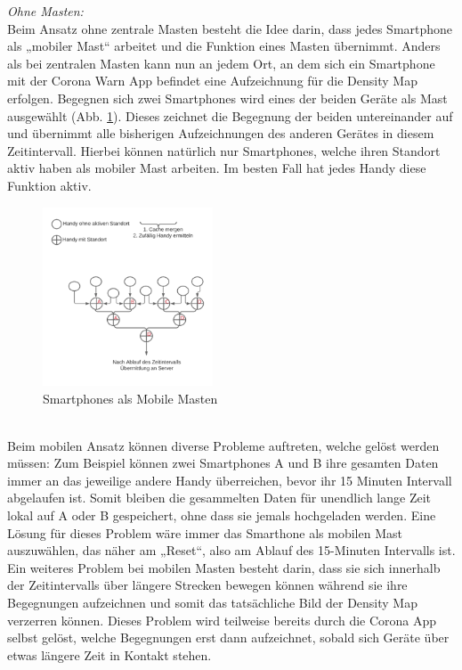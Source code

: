\documentclass[conference]{IEEEtran}
\begin{document}
\textit{Ohne Masten:}\\
Beim Ansatz ohne zentrale Masten besteht die Idee darin, dass jedes Smartphone als „mobiler Mast“ arbeitet und die Funktion eines Masten übernimmt. 
Anders als bei zentralen Masten kann nun an jedem Ort, an dem sich ein Smartphone mit der Corona Warn App befindet eine Aufzeichnung für die Density Map erfolgen. 
Begegnen sich zwei Smartphones wird eines der beiden Geräte als Mast ausgewählt (Abb. \ref{mobile_mast}). 
Dieses zeichnet die Begegnung der beiden untereinander auf und übernimmt alle bisherigen Aufzeichnungen des anderen Gerätes in diesem Zeitintervall. Hierbei können natürlich nur Smartphones, welche ihren Standort aktiv haben als mobiler Mast arbeiten. 
Im besten Fall hat jedes Handy diese Funktion aktiv. \\
\begin{figure}[h]
	\centering
	\includegraphics[width=0.45\textwidth]{"Mobile_Mast"}
	\caption{Smartphones als Mobile Masten}
	\label{mobile_mast}
\end{figure} \\
Beim mobilen Ansatz können diverse Probleme auftreten, welche gelöst werden müssen: Zum Beispiel können zwei Smartphones A und B ihre gesamten Daten immer an das jeweilige andere Handy überreichen, bevor ihr 15 Minuten Intervall abgelaufen ist. 
Somit bleiben die gesammelten Daten für unendlich lange Zeit lokal auf A oder B gespeichert, ohne dass sie jemals hochgeladen werden. 
Eine Lösung für dieses Problem wäre immer das Smarthone als mobilen Mast auszuwählen, das näher am „Reset“, also am Ablauf des 15-Minuten Intervalls ist. 
Ein weiteres Problem bei mobilen Masten besteht darin, dass sie sich innerhalb der Zeitintervalls über längere Strecken bewegen können während sie ihre Begegnungen aufzeichnen und somit das tatsächliche Bild der Density Map verzerren können. 
Dieses Problem wird teilweise bereits durch die Corona App selbst gelöst, welche Begegnungen erst dann aufzeichnet, sobald sich Geräte über etwas längere Zeit in Kontakt stehen. 
\end{document}

